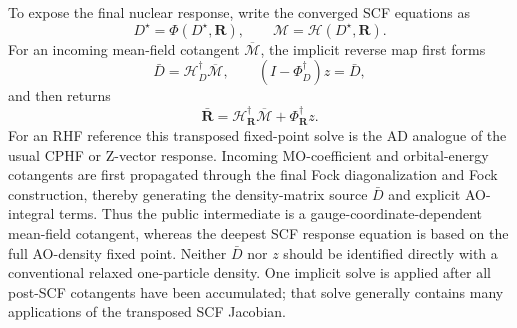 \documentclass[11pt]{article}
\begin{document}
To expose the final nuclear response, write the converged SCF equations as
\begin{equation}
 D^\star=\Phi(D^\star,\mathbf R),\qquad
 \mathcal M=\mathcal H(D^\star,\mathbf R).
 \label{eq:scf-fixed-point-map}
\end{equation}
For an incoming mean-field cotangent $\overline{\mathcal M}$, the implicit
reverse map first forms
\begin{equation}
 \bar D=\mathcal H_D^\dagger\overline{\mathcal M},\qquad
 (I-\Phi_D^\dagger)z=\bar D,
 \label{eq:scf-adjoint}
\end{equation}
and then returns
\begin{equation}
 \bar{\mathbf R}
 =\mathcal H_{\mathbf R}^\dagger\overline{\mathcal M}
  +\Phi_{\mathbf R}^\dagger z.
 \label{eq:scf-nuclear-cotangent}
\end{equation}
For an RHF reference this transposed fixed-point solve is the AD analogue of
the usual CPHF or Z-vector response.  Incoming MO-coefficient and
orbital-energy cotangents are first propagated through the final Fock
diagonalization and Fock construction, thereby generating the density-matrix
source $\bar D$ and explicit AO-integral terms.  Thus the public intermediate
is a gauge-coordinate-dependent mean-field cotangent, whereas the deepest
SCF response equation is based on the full AO-density fixed point.  Neither
$\bar D$ nor $z$ should be identified directly with a conventional relaxed
one-particle density.  One implicit solve is applied after all post-SCF
cotangents have been accumulated; that solve generally contains many
applications of the transposed SCF Jacobian.
\end{document}
